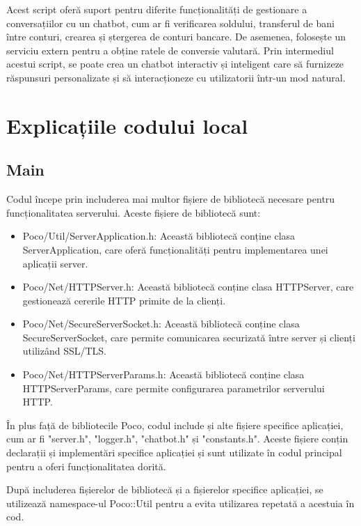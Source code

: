 Acest script oferă suport pentru diferite funcționalități de gestionare a conversațiilor cu un chatbot, cum ar fi verificarea soldului, transferul de bani între conturi, crearea și ștergerea de conturi bancare. De asemenea, folosește un serviciu extern pentru a obține ratele de conversie valutară. Prin intermediul acestui script, se poate crea un chatbot interactiv și inteligent care să furnizeze răspunsuri personalizate și să interacționeze cu utilizatorii într-un mod natural.

\chapter{Explicațiile codului local}

\section{Main}

Codul începe prin includerea mai multor fișiere de bibliotecă necesare pentru funcționalitatea serverului. Aceste fișiere de bibliotecă sunt:

\begin{itemize}
  \item Poco/Util/ServerApplication.h: Această bibliotecă conține clasa ServerApplication, care oferă funcționalități pentru implementarea unei aplicații server.
  \item Poco/Net/HTTPServer.h: Această bibliotecă conține clasa HTTPServer, care gestionează cererile HTTP primite de la clienți.
  \item Poco/Net/SecureServerSocket.h: Această bibliotecă conține clasa SecureServerSocket, care permite comunicarea securizată între server și clienți utilizând SSL/TLS.
  \item Poco/Net/HTTPServerParams.h: Această bibliotecă conține clasa HTTPServerParams, care permite configurarea parametrilor serverului HTTP.
\end{itemize}

În plus față de bibliotecile Poco, codul include și alte fișiere specifice aplicației, cum ar fi "server.h", "logger.h", "chatbot.h" și "constants.h". Aceste fișiere conțin declarații și implementări specifice aplicației și sunt utilizate în codul principal pentru a oferi funcționalitatea dorită.

După includerea fișierelor de bibliotecă și a fișierelor specifice aplicației, se utilizează namespace-ul Poco::Util pentru a evita utilizarea repetată a acestuia în cod.

